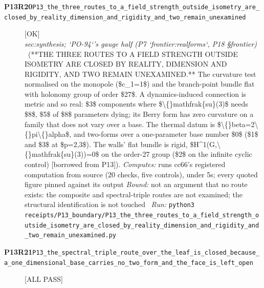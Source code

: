 \begin{description}
\item[\textbf{P13R20}\quad\texttt{P13\_the\_three\_routes\_to\_a\_field\_strength\_outside\_isometry\_are\_closed\_by\_reality\_dimension\_and\_rigidity\_and\_two\_remain\_unexamined}]\hfill\textsf{[OK]}\\
\textit{sec:synthesis; `PO-94`'s gauge half (P7 `frontier:realforms`, P18 \S{}frontier)} \ (**THE THREE ROUTES TO A FIELD STRENGTH OUTSIDE ISOMETRY ARE CLOSED BY REALITY, DIMENSION AND RIGIDITY, AND TWO REMAIN UNEXAMINED.** The curvature test normalised on the monopole (\$c\_1=1\$) and the branch-point bundle flat with holonomy group of order \$27\$. A dynamics-induced connection is metric and so real: \$3\$ components where \$\textbackslash\{\}mathfrak\{su\}(3)\$ needs \$8\$, \$5\$ of \$8\$ parameters dying; its Berry form has zero curvature on a family that does not vary over a base. The thermal datum is \$\textbackslash\{\}beta=2\textbackslash\{\}pi\textbackslash\{\}alpha\$, and two-forms over a one-parameter base number \$0\$ (\$1\$ and \$3\$ at \$p=2,3\$). The walls' flat bundle is rigid, \$H\textasciicircum{}1(G,\textbackslash\{\}mathfrak\{su\}(3))=0\$ on the order-27 group (\$2\$ on the infinite cyclic control) [borrowed from P13]). 
\emph{Computes:} runs cc66's registered computation from source (20 checks, five controls), under 5s; every quoted figure pinned against its output
 \emph{Bound:} not an argument that no route exists: the composite and spectral-triple routes are not examined; the structural identification is not touched
\ \emph{Run:} \texttt{python3 receipts/P13\_boundary/P13\_the\_three\_routes\_to\_a\_field\_strength\_outside\_isometry\_are\_closed\_by\_reality\_dimension\_and\_rigidity\_and\_two\_remain\_unexamined.py}
\item[\textbf{P13R21}\quad\texttt{P13\_the\_spectral\_triple\_route\_over\_the\_leaf\_is\_closed\_because\_a\_one\_dimensional\_base\_carries\_no\_two\_form\_and\_the\_face\_is\_left\_open}]\hfill\textsf{[ALL PASS]}\\

\end{description}
